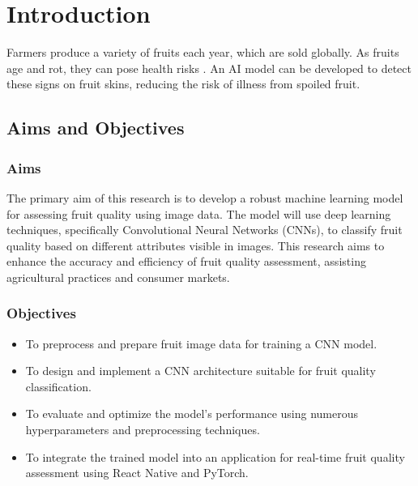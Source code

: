 \documentclass[a4paper,oneside,11pt]{book}
\begin{document}
\MakeTitle 

\tableofcontents

\newpage
\setcounter{page}{2}
\listoffigures

\cleardoublepage 
{} 

\chapter{Introduction}
Farmers produce a variety of fruits each year, which are sold globally. As fruits age and rot, they can pose health risks \citep{sudhakara2022statistical}. An AI model can be developed to detect these signs on fruit skins, reducing the risk of illness from spoiled fruit.
\section{Aims and Objectives}
\subsection{Aims}
The primary aim of this research is to develop a robust machine learning model for assessing fruit quality using image data. The model will use deep learning techniques, specifically Convolutional Neural Networks (CNNs), to classify fruit quality based on different attributes visible in images. This research aims to enhance the accuracy and efficiency of fruit quality assessment, assisting agricultural practices and consumer markets.
\subsection{Objectives}
\begin{itemize}
    \item To preprocess and prepare fruit image data for training a CNN model.
    \item To design and implement a CNN architecture suitable for fruit quality classification.
    \item To evaluate and optimize the model's performance using numerous hyperparameters and preprocessing techniques.
    \item To integrate the trained model into an application for real-time fruit quality assessment using React Native and PyTorch.
\end{itemize}
\end{document}
